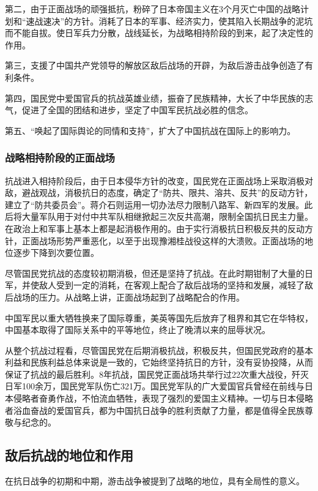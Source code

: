 \documentclass{article}
\begin{document}
\begin{CJK}{UTF8}{song}
第二，由于正面战场的顽强抵抗，粉碎了日本帝国主义在3个月灭亡中国的战略计划和“速战速决”的方针。消耗了日本的军事、经济实力，使其陷入长期战争的泥坑而不能自拔。使日军兵力分散，战线延长，为战略相持阶段的到来，起了决定性的作用。

第三，支援了中国共产党领导的解放区敌后战场的开辟，为敌后游击战争创造了有利条件。

第四，国民党中爱国官兵的抗战英雄业绩，振奋了民族精神，大长了中华民族的志气，促进了全国的团结和进步，坚定了中国军民抗战必胜的信念。

第五、“唤起了国际舆论的同情和支持”，扩大了中国抗战在国际上的影响力。
\subsubsection{战略相持阶段的正面战场}

抗战进入相持阶段后，由于日本侵华方针的改变，国民党在正面战场上采取消极对敌，避战观战，消极抗日的态度，确定了“防共、限共、溶共、反共”的反动方针，建立了“防共委员会”。蒋介石则运用一切办法尽力限制八路军、新四军的发展。此后将大量军队用于对付中共军队相继掀起三次反共高潮，限制全国抗日民主力量。在政治上和军事上基本上都是起消极作用的。由于实行消极抗日积极反共的反动方针，正面战场形势严重恶化，以至于出现豫湘桂战役这样的大溃败。正面战场的地位逐步下降到次要位置。

尽管国民党抗战的态度较初期消极，但还是坚持了抗战。在此时期钳制了大量的日军，并使敌人受到一定的消耗，在客观上配合了敌后战场的坚持和发展，减轻了敌后战场的压力。从战略上讲，正面战场起到了战略配合的作用。

中国军民以重大牺牲换来了国际尊重，美英等国先后放弃了租界和其它在华特权，中国基本取得了国际关系中的平等地位，终止了晚清以来的屈辱状况。

从整个抗战过程看，尽管国民党在后期消极抗战，积极反共，但国民党政府的基本利益和民族利益总体来说是一致的，它始终坚持抗日的方针，没有妥协投降，从而保证了抗战的最后胜利。8年抗战，国民党正面战场共举行过22次重大战役，歼灭日军100余万，国民党军队伤亡321万。国民党军队的广大爱国官兵曾经在前线与日本侵略者奋勇作战，不怕流血牺牲，表现了强烈的爱国主义精神。一切与日本侵略者浴血奋战的爱国官兵，都为中国抗日战争的胜利贡献了力量，都是值得全民族尊敬与纪念的。

\subsection{敌后抗战的地位和作用}

在抗日战争的初期和中期，游击战争被提到了战略的地位，具有全局性的意义。


\end{CJK}
\end{document}
